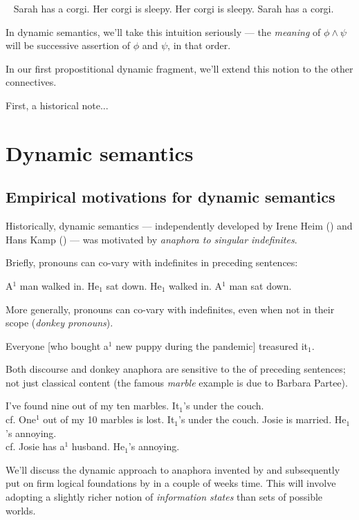 \documentclass[nols,twoside,nofonts,nobib,nohyper]{tufte-handout}
\theoremstyle{definition}
\begin{document}
\pex~
\a Sarah has a corgi. Her corgi is sleepy.
\a\ljudge{\#} Her corgi is sleepy. Sarah has a corgi.
\xe

In dynamic semantics, we'll take this intuition seriously --- the \textit{meaning} of $ϕ ∧ ψ$ will be successive assertion of $ϕ$ and $ψ$, in that order.

In our first propostitional dynamic fragment, we'll extend this notion to the other connectives.

First, a historical note...

\section{Dynamic semantics}

\subsection{Empirical motivations for dynamic semantics}

Historically, dynamic semantics --- independently developed by Irene Heim (\citeyear{Heim1982}) and Hans Kamp (\citeyear{Kamp1981}) --- was motivated by \textit{anaphora to singular indefinites}.

Briefly, pronouns can co-vary with indefinites in preceding sentences:

\pex
\a A$^{1}$ man walked in. He$_{1}$ sat down.
\a\ljudge{\#}He$_{1}$ walked in. A$^{1}$ man sat down.
\xe

More generally, pronouns can co-vary with indefinites, even when not in their scope (\textit{donkey pronouns}).

\ex Everyone [who bought a$^{1}$ new puppy during the pandemic] treasured it$_{1}$.
\xe

Both discourse and donkey anaphora are sensitive to the  of preceding sentences; not just classical content (the famous \textit{marble} example is due to Barbara Partee).

\pex
\a\ljudge{\#}I've found nine out of my ten marbles. It$_{1}$'s under the couch.\\
cf. One$^{1}$ out of my 10 marbles is lost. It$_{1}$'s under the couch.
\a\ljudge{*}Josie is married. He$_{1}$'s annoying.\\
cf. Josie has a$^{1}$ husband. He$_{1}$'s annoying.
\xe

We'll discuss the dynamic approach to anaphora invented by \citet{Heim1982} and subsequently put on firm logical foundations by \citet{GroenendijkStokhof1991} in a couple of weeks time. This will involve adopting a slightly richer notion of \textit{information states} than sets of possible worlds.
\end{document}
